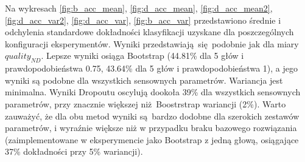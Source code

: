Na wykresach \ref{fig:b_acc_mean}, \ref{fig:d_acc_mean}, \ref{fig:d_acc_mean2}, \ref{fig:d_acc_var2}, \ref{fig:d_acc_var}, \ref{fig:b_acc_var} przedstawiono średnie i odchylenia standardowe dokładności klasyfikacji uzyskane dla poszczególnych konfiguracji eksperymentów. Wyniki przedstawiają się podobnie jak dla miary $quality_{ND}$. Lepsze wyniki osiąga Bootstrap (44.81\% dla 5 głów i prawdopodobieństwa 0.75, 43.64\%  dla 5 głów i prawdopodobieństwa 1), a jego wyniki są podobne dla wszystkich sensownych parametrów. Wariancja jest minimalna. Wyniki Dropoutu oscylują dookoła 39\% dla wszystkich sensownych parametrów, przy znacznie większej niż Boostrstrap wariancji (2\%). Warto zauważyć, że dla obu metod wyniki są bardzo dodobne dla szerokich zestawów parametrów, i wyraźnie większe niż w przypadku braku bazowego rozwiązania (zaimplementowane w eksperymencie jako Bootstrap z jedną głową, osiągające 37\% dokładności przy 5\% wariancji).


